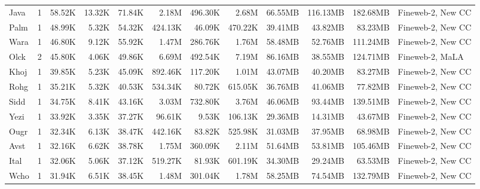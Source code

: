 \begin{table*}[!htp]
{\begin{tabular}{l|c|rrr|rrr|rrr|l}
Java                    & 1                        & 58.52K   & 13.32K   & 71.84K  & 2.18M   & 496.30K & 2.68M   & 66.55MB  & 116.13MB & 182.68MB & Fineweb-2, New CC              \\
Palm                    & 1                        & 48.99K   & 5.32K    & 54.32K  & 424.13K & 46.09K  & 470.22K & 39.41MB  & 43.82MB  & 83.23MB  & Fineweb-2, New CC              \\
Wara                    & 1                        & 46.80K   & 9.12K    & 55.92K  & 1.47M   & 286.76K & 1.76M   & 58.48MB  & 52.76MB  & 111.24MB & Fineweb-2, New CC              \\
Olck                    & 2                        & 45.80K   & 4.06K    & 49.86K  & 6.69M   & 492.54K & 7.19M   & 86.16MB  & 38.55MB  & 124.71MB & Fineweb-2, MaLA                \\
Khoj                    & 1                        & 39.85K   & 5.23K    & 45.09K  & 892.46K & 117.20K & 1.01M   & 43.07MB  & 40.20MB  & 83.27MB  & Fineweb-2, New CC              \\
Rohg                    & 1                        & 35.21K   & 5.32K    & 40.53K  & 534.34K & 80.72K  & 615.05K & 36.76MB  & 41.06MB  & 77.82MB  & Fineweb-2, New CC              \\
Sidd                    & 1                        & 34.75K   & 8.41K    & 43.16K  & 3.03M   & 732.80K & 3.76M   & 46.06MB  & 93.44MB  & 139.51MB & Fineweb-2, New CC              \\
Yezi                    & 1                        & 33.92K   & 3.35K    & 37.27K  & 96.61K  & 9.53K   & 106.13K & 29.36MB  & 14.31MB  & 43.67MB  & Fineweb-2, New CC              \\
Ougr                    & 1                        & 32.34K   & 6.13K    & 38.47K  & 442.16K & 83.82K  & 525.98K & 31.03MB  & 37.95MB  & 68.98MB  & Fineweb-2, New CC              \\
Avst                    & 1                        & 32.16K   & 6.62K    & 38.78K  & 1.75M   & 360.09K & 2.11M   & 51.64MB  & 53.81MB  & 105.46MB & Fineweb-2, New CC              \\
Ital                    & 1                        & 32.06K   & 5.06K    & 37.12K  & 519.27K & 81.93K  & 601.19K & 34.30MB  & 29.24MB  & 63.53MB  & Fineweb-2, New CC              \\
Wcho                    & 1                        & 31.94K   & 6.51K    & 38.45K  & 1.48M   & 301.04K & 1.78M   & 58.25MB  & 74.54MB  & 132.79MB & Fineweb-2, New CC              \\

\end{tabular}}
\end{table*}
